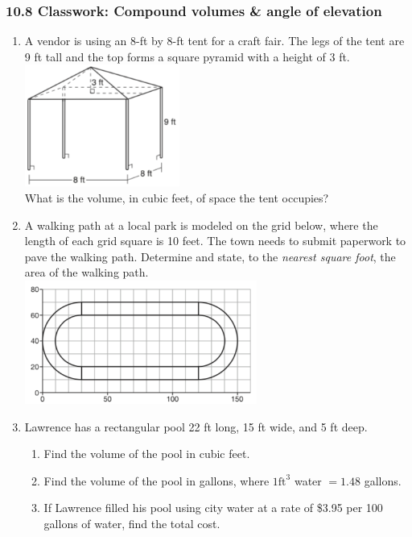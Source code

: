 \documentclass[12pt, twoside]{article}
\begin{document}
\subsubsection*{10.8 Classwork: Compound volumes \& angle of elevation}
 \begin{enumerate}

  \item A vendor is using an 8-ft by 8-ft tent for a craft fair. The legs of the tent are 9 ft tall and the top forms a square pyramid with a height of 3 ft.\\[1cm]
    \includegraphics[width=0.4\textwidth]{tent_Jan2019-9.png}\\[0.5cm]
    What is the volume, in cubic feet, of space the tent occupies? \vspace{3cm}

  \item A walking path at a local park is modeled on the grid below, where the length of each grid square is 10 feet. The town needs to submit paperwork to pave the walking path. Determine and state, to the \emph{nearest square foot}, the area of the walking path.\\[0.3cm]
    \includegraphics[width=0.6\textwidth]{path_Jan2019-31.png} \vspace{3cm}

  \item Lawrence has a rectangular pool 22 ft long, 15 ft wide, and 5 ft deep.
    \begin{enumerate}
      \item Find the volume of the pool in cubic feet. \vspace{2cm}
      \item Find the volume of the pool in gallons, where $1 \mathrm{ ft}^3$ water $= 1.48$ gallons. \vspace{2cm}
      \item If Lawrence filled his pool using city water at a rate of \$3.95 per 100 gallons of water, find the total cost.
    \end{enumerate} \vspace{2cm}


\end{enumerate}
\end{document}
